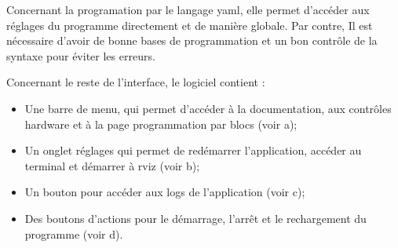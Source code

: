 Concernant la programation par le langage \gls{yaml}, elle permet d'accéder aux réglages du programme directement et de manière globale. Par contre, Il est nécessaire d'avoir de bonne bases de programmation et un bon contrôle de la syntaxe pour éviter les erreurs.

Concernant le reste de l'interface, le logiciel contient :

\begin{itemize}
    \item Une barre de menu, qui permet d'accéder à la documentation, aux contrôles \gls{hardware} et à la page programmation par blocs (voir a);
    \item Un onglet réglages qui permet de redémarrer l'application, accéder au terminal et démarrer à \gls{rviz} (voir b);
    \item Un bouton pour accéder aux \gls{logs} de l'application (voir c);
    \item Des boutons d'actions pour le démarrage, l'arrêt et le rechargement du programme (voir d).
\end{itemize}

